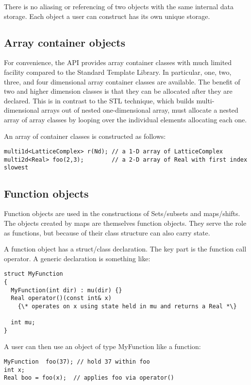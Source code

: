 \documentclass[12pt,letterpaper]{article}
\begin{document}
There is no aliasing or referencing of two objects with the same
internal data storage. Each object a user can construct has its own
unique storage.

\subsection{Array container objects}
\label{sec:arrays}

For convenience, the API provides array container classes with much
limited facility compared to the Standard Template Library. In
particular, one, two, three, and four dimensional array container
classes are available. The benefit of two and higher dimension classes
is that they can be allocated after they are declared. This is in
contrast to the STL technique, which builds multi-dimensional arrays
out of nested one-dimensional array, must allocate a nested array of
array classes by looping over the individual elements allocating each
one.

An array of container classes is constructed as follows:
%
\begin{verbatim}
multi1d<LatticeComplex> r(Nd); // a 1-D array of LatticeComplex
multi2d<Real> foo(2,3);        // a 2-D array of Real with first index slowest
\end{verbatim}


\subsection{Function objects}
\label{sec:funcobj}

Function objects are used in the constructions of Sets/subsets and
maps/shifts. The objects created by maps are themselves function
objects.  They serve the role as functions, but because of their class
structure can also carry state.

A function object has a struct/class declaration. The key part is
the function call operator. A generic declaration is something like:
%
\begin{verbatim}
struct MyFunction
{
  MyFunction(int dir) : mu(dir) {}
  Real operator()(const int& x)
    {\* operates on x using state held in mu and returns a Real *\}

  int mu;
}
\end{verbatim}

A user can then use an object of type MyFunction like a function:
%
\begin{verbatim}
MyFunction  foo(37); // hold 37 within foo
int x;
Real boo = foo(x);  // applies foo via operator()
\end{verbatim}
\end{document}
